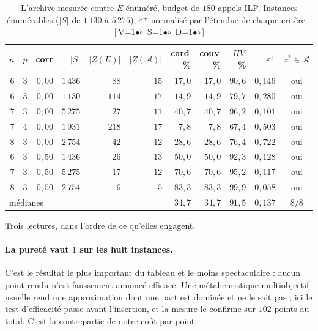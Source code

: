 \documentclass[11pt,a4paper]{article}
\theoremstyle{plain}
\theoremstyle{remark}
\newcommand{\cfgm}[1]{\ifnum#1=1$\bullet$\else$\circ$\fi}
\newcommand{\conf}[3]{%
  \textsf{\footnotesize[\,V\cfgm{#1}\ S\cfgm{#2}\ D\cfgm{#3}\,]}}
\begin{document}
\begin{table}[H]
\centering
\caption{L'archive mesurée contre $E$ énuméré, budget de $180$ appels ILP.
Instances énumérables ($|S|$ de $1\,130$ à $5\,275$), $\varepsilon^+$
normalisé par l'étendue de chaque critère.\ \conf{1}{1}{1}}
\label{tab:livrableA}
\begin{tabular}{rrrrrrrrrrc}
\toprule
$n$ & $p$ & corr & $|S|$ & $|Z(E)|$ & $|Z(\mathcal{A})|$ &
card\,\% & couv\,\% & $HV$\,\% & $\varepsilon^+$ & $z^\ast\!\in\!\mathcal{A}$\\
\midrule
$6$ & $3$ & $0{,}00$ & $1\,436$ & $88$  & $15$ & $17{,}0$ & $17{,}0$ & $90{,}6$ & $0{,}146$ & oui\\
$6$ & $3$ & $0{,}00$ & $1\,130$ & $114$ & $17$ & $14{,}9$ & $14{,}9$ & $79{,}7$ & $0{,}280$ & oui\\
$7$ & $3$ & $0{,}00$ & $5\,275$ & $27$  & $11$ & $40{,}7$ & $40{,}7$ & $96{,}2$ & $0{,}101$ & oui\\
$7$ & $4$ & $0{,}00$ & $1\,931$ & $218$ & $17$ & $7{,}8$  & $7{,}8$  & $67{,}4$ & $0{,}503$ & oui\\
$8$ & $3$ & $0{,}00$ & $2\,754$ & $42$  & $12$ & $28{,}6$ & $28{,}6$ & $76{,}4$ & $0{,}722$ & oui\\
$6$ & $3$ & $0{,}50$ & $1\,436$ & $26$  & $13$ & $50{,}0$ & $50{,}0$ & $92{,}3$ & $0{,}128$ & oui\\
$7$ & $3$ & $0{,}50$ & $5\,275$ & $17$  & $12$ & $70{,}6$ & $70{,}6$ & $95{,}2$ & $0{,}117$ & oui\\
$8$ & $3$ & $0{,}50$ & $2\,754$ & $6$   & $5$  & $83{,}3$ & $83{,}3$ & $99{,}9$ & $0{,}058$ & oui\\
\midrule
\multicolumn{6}{l}{médianes} & $34{,}7$ & $34{,}7$ & $91{,}5$ & $0{,}137$ & $8/8$\\
\bottomrule
\end{tabular}
\end{table}

Trois lectures, dans l'ordre de ce qu'elles engagent.

\paragraph{La pureté vaut $1$ sur les huit instances.}
C'est le résultat le plus important du tableau et le moins spectaculaire :
aucun point rendu n'est faussement annoncé efficace. Une métaheuristique
multiobjectif usuelle rend une approximation dont une part est dominée et ne
le sait pas ; ici le test d'efficacité passe avant l'insertion,
et la mesure le confirme sur $102$ points au total. C'est la contrepartie de
notre coût par point.
\end{document}
